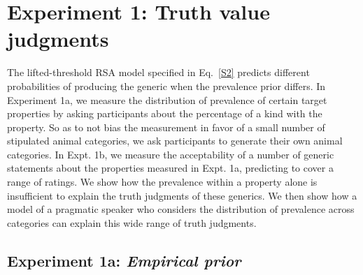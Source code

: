 \documentclass[10pt,letterpaper]{article}
\begin{document}
%

\section{Experiment 1: Truth value judgments}

The lifted-threshold RSA model specified in Eq.~\ref{S2} predicts different probabilities of producing the generic when the prevalence prior differs. 
In Experiment 1a, we measure the distribution of prevalence of certain target properties by asking participants about the percentage of a kind with the property. 
So as to not bias the measurement in favor of a small number of stipulated animal categories, we ask participants to generate their own animal categories. 
In Expt. 1b, we measure the acceptability of a number of generic statements about the properties measured in Expt. 1a, predicting to cover a range of ratings. 
We show how the prevalence within a property alone is insufficient to explain the truth judgments of these generics. 
We then show how a model of a pragmatic speaker who considers the distribution of prevalence across categories can explain this wide range of truth judgments.

\subsection{Experiment 1a: \emph{Empirical prior}}
\end{document}
